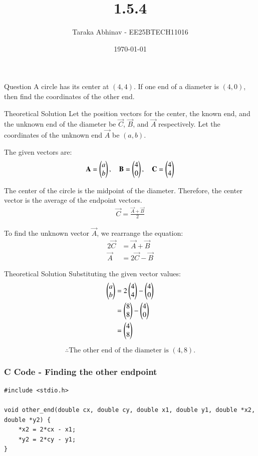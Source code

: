 \documentclass{beamer}
\title{1.5.4}
\author{Taraka Abhinav - EE25BTECH11016}
\date{\today}
\begin{document}
\frame{\titlepage}

\begin{frame}{Question}
A circle has its center at $(4, 4)$. If one end of a diameter is $(4, 0)$, then find the coordinates of the other end.
\end{frame}

\begin{frame}{Theoretical Solution}
Let the position vectors for the center, the known end, and the unknown end of the diameter be $\vec{C}$, $\vec{B}$, and $\vec{A}$ respectively. Let the coordinates of the unknown end $\vec{A}$ be $(a,b)$.

The given vectors are:
\begin{align}
\mathbf{A} = \begin{pmatrix}a\\b\end{pmatrix}, \quad \mathbf{B} = \begin{pmatrix}4\\0\end{pmatrix}, \quad \mathbf{C} = \begin{pmatrix}4\\4\end{pmatrix}
\end{align}

The center of the circle is the midpoint of the diameter. Therefore, the center vector is the average of the endpoint vectors.
\begin{align}
\vec{C} = \frac{\vec{A}+\vec{B}}{2}
\end{align}

To find the unknown vector $\vec{A}$, we rearrange the equation:
\begin{align}
2\vec{C} &= \vec{A} + \vec{B} \\
\vec{A} &= 2\vec{C} - \vec{B}
\end{align}

\end{frame}

\begin{frame}{Theoretical Solution}
Substituting the given vector values:
\begin{align}
\begin{pmatrix}a\\b\end{pmatrix} &= 2\begin{pmatrix}4\\4\end{pmatrix} - \begin{pmatrix}4\\0\end{pmatrix} \nonumber \\
&= \begin{pmatrix}8\\8\end{pmatrix} - \begin{pmatrix}4\\0\end{pmatrix} \\
&= \begin{pmatrix}4\\8\end{pmatrix}
\end{align}

\[ \therefore \text{The other end of the diameter is }(4,8). \]
\end{frame}

\begin{frame}[fragile]
    \frametitle{C Code - Finding the other endpoint}
    \begin{lstlisting}
#include <stdio.h>

void other_end(double cx, double cy, double x1, double y1, double *x2, double *y2) {
    *x2 = 2*cx - x1;
    *y2 = 2*cy - y1;
}
    \end{lstlisting}
\end{frame}
\end{document}

